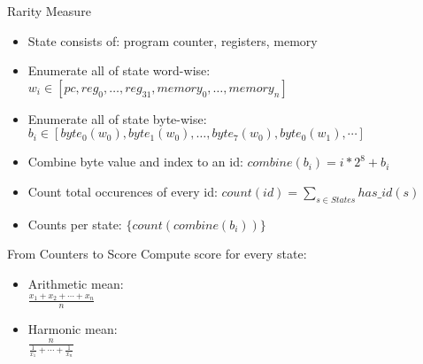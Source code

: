 \documentclass[10pt]{beamer}
\begin{document}
\begin{frame}{Rarity Measure}
	\begin{itemize}
    \item State consists of: program counter, registers, memory
    \item Enumerate all of state word-wise: $w_i \in [pc, reg_0, \ldots, reg_{31}, memory_0, \ldots, memory_n]$
    \item Enumerate all of state byte-wise: $b_i \in [ byte_0(w_0), byte_1(w_0), \ldots, byte_7(w_0), byte_0(w_1), \cdots ]$
    \item Combine byte value and index to an id: $combine(b_i) = i * 2^8 + b_i$
    \item Count total occurences of every id: $count(id) = \sum_{s \in States} has\_id(s)$
    \item Counts per state: $\{ count(combine(b_i)) \}$
	\end{itemize}
\end{frame}

\begin{frame}{From Counters to Score}
  Compute score for every state:

  \begin{itemize}
    \item Arithmetic mean: \\
      $\frac{x_1 + x_2 + \cdots + x_n}{n}$
    \item Harmonic mean: \\
      $\frac{n}{\frac{1}{x_1} + \dotsb + \frac{1}{x_n}}$
  \end{itemize}
\end{frame}


\nocite{*}
\begin{frame}[allowframebreaks]
    \printbibliography
\end{frame}
\end{document}
